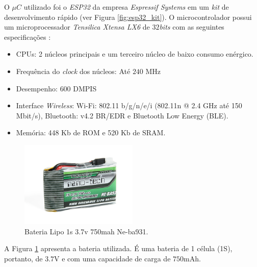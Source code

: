 O $\mu{}C$ utilizado foi o \emph{ESP32} da empresa \emph{Espressif Systems} em um \emph{kit} de desenvolvimento rápido (ver Figura \ref{fig:esp32_kit}). O microcontrolador possui um microprocessador \emph{Tensilica Xtensa LX6} de $32$\emph{bits} com as seguintes especificações \cite{esp32:datasheet}:

\begin{itemize}
    \item CPUs: 2 núcleos principais e um terceiro núcleo de baixo consumo enérgico. 
    \item Frequência do \emph{clock} dos núcleos: Até $240$ MHz
    \item Desempenho: $600$ DMPIS
    \item Interface \emph{Wireless}: Wi-Fi: 802.11 b/g/n/e/i (802.11n @ 2.4 GHz até 150 Mbit/s), Bluetooth: v4.2 BR/EDR e Bluetooth Low Energy (BLE).
    \item Memória: 448 Kb de ROM e 520 Kb de SRAM.
\end{itemize}


\begin{figure}[H]
    \centering
    \includegraphics[width=0.5\textwidth]{figuras/eletronica/bateria.jpg}
    \caption{Bateria Lipo 1s 3.7v 750mah Ne-ba931.}
    \label{fig:bateria_lipo}
\end{figure}

A Figura \ref{fig:bateria_lipo} apresenta a bateria utilizada. É uma bateria de 1 célula (1S), portanto, de $3.7$V e com uma capacidade de carga de $750$mAh.
